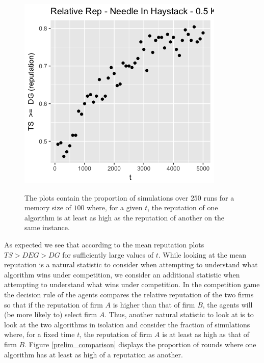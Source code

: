 \documentclass{article}
\theoremstyle{definition}
\begin{document}
\begin{figure}
\includegraphics[scale=0.25]{"figures/ts_dg_nih_10_prelim"} \\
\caption*{\tiny{The plots contain the proportion of simulations over $250$ runs for a memory size of $100$ where, for a given $t$, the reputation of one algorithm is at least as high as the reputation of another on the same instance.}}
\label{relative_rep}
\end{figure}

As expected we see that according to the mean reputation plots $TS > DEG > DG$ for sufficiently large values of $t$. While looking at the mean reputation is a natural statistic to consider when attempting to understand what algorithm wins under competition, we consider an additional statistic when attempting to understand what wins under competition. In the competition game the decision rule of the agents compares the relative reputation of the two firms so that if the reputation of firm $A$ is higher than that of firm $B$, the agents will (be more likely to) select firm $A$. Thus, another natural statistic to look at is to look at the two algorithms in isolation and consider the fraction of simulations where, for a fixed time $t$, the reputation of firm $A$ is at least as high as that of firm $B$. Figure \ref{prelim_comparison} displays the proportion of rounds where one algorithm has at least as high of a reputation as another.
\end{document}
